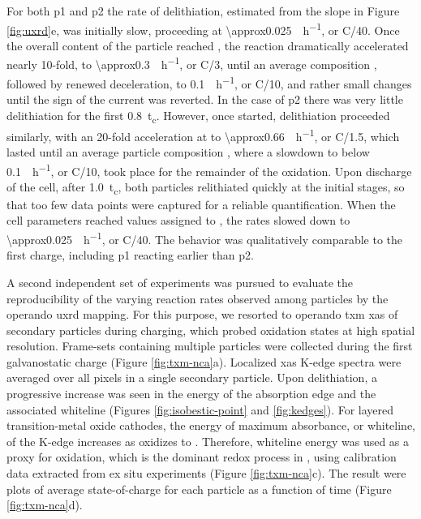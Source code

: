 \documentclass{article}
\begin{document}
For both \gls{p1} and \gls{p2} the rate of delithiation, estimated from the slope in Figure
\ref{fig:uxrd}e,
was initially slow, proceeding at \SI{\approx0.025}{\per\hour},
or C/40. Once the overall content of the particle reached
, the
reaction dramatically accelerated nearly 10-fold, to \SI{\approx0.3}{\per\hour}, or C/3, until an average
composition , followed by renewed deceleration, to \SI{0.1}{\per\hour}, or C/10, and rather small changes until the sign
of the current was reverted. In the case of \gls{p2} there was very
little delithiation for the first \SI{0.8}{t_c}. However, once started, delithiation
proceeded similarly, with an 20-fold acceleration at  to
\SI{\approx0.66}{\per\hour}, or
C/1.5, which lasted until an average particle composition , where a slowdown to below \SI{0.1}{\per\hour}, or
C/10, took place for the remainder of the oxidation. Upon discharge of the cell, after \SI{1.0}{t_c}, both particles relithiated quickly at the initial stages, so that too few data points
were captured for a reliable quantification. When the cell parameters reached values assigned to , the rates slowed down to \SI{\approx0.025}{\per\hour},
or C/40. The behavior was qualitatively comparable to the first charge, including \gls{p1} reacting earlier than \gls{p2}. 




A second independent set of experiments was pursued to evaluate the reproducibility of the varying reaction rates observed among particles by the operando \gls{uxrd} mapping. For this purpose, we resorted to operando \Gls{txm} \gls{xas} of \nca{} secondary
particles during charging, which probed  oxidation states at high spatial resolution. Frame-sets containing multiple particles were collected during the first
galvanostatic charge (Figure
\ref{fig:txm-nca}a). Localized \gls{xas} K-edge spectra were averaged over all pixels
in a single secondary particle. Upon
delithiation, a progressive increase was seen in the energy of the
absorption edge and the associated whiteline (Figures
\ref{fig:isobestic-point} and \ref{fig:kedges}). For
layered transition-metal oxide cathodes, the energy of maximum
absorbance, or whiteline, of the  K-edge increases as
 oxidizes to . Therefore, whiteline energy was
used as a proxy for  oxidation, which is the dominant redox
process in \nca{}, using calibration data extracted from ex situ experiments (Figure \ref{fig:txm-nca}c). The result were plots of average state-of-charge for each particle as a function
of time (Figure \ref{fig:txm-nca}d).
\end{document}
